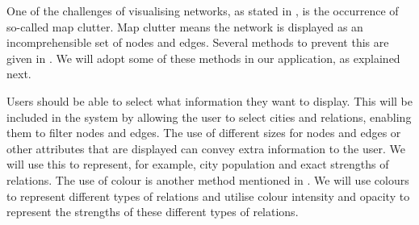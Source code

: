 One of the challenges of visualising networks, as stated in \cite{468391}, is the occurrence of so-called map clutter. Map clutter means the network is displayed as an incomprehensible set of nodes and edges.
Several methods to prevent this are given in \cite{468391}. We will adopt some of these methods in our application, as explained next.

Users should be able to select what information they want to display. This will be included in the system by allowing the user to select cities and relations, enabling them to filter nodes and edges. The use of different sizes for nodes and edges or other attributes that are displayed can convey extra information to the user. We will use this to represent, for example, city population and exact strengths of relations.
The use of colour is another method mentioned in \cite{468391}. We will use colours to represent different types of relations and utilise colour intensity and opacity to represent the strengths of these different types of relations.







